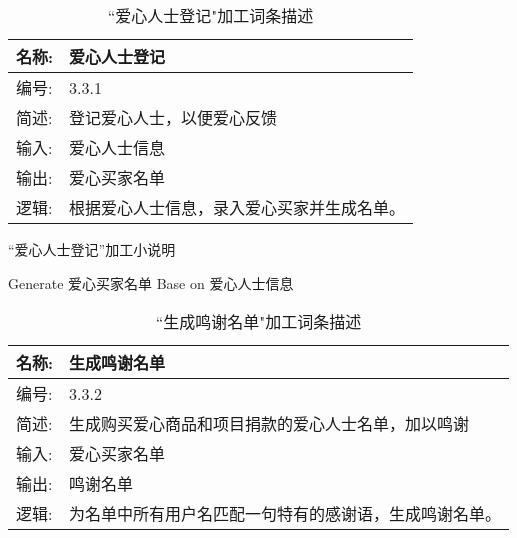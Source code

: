 \begin{table}[H]  
    \caption{``爱心人士登记"加工词条描述}  
    \begin{center}  
        \begin{tabular}{l p{11cm}} 
            \hline
            \quad 名称:  &   爱心人士登记 \\
            \hline
            \quad 编号:  & 3.3.1 \\
            \hline
            \quad 简述:  & 登记爱心人士，以便爱心反馈 \\
            \hline
            \quad 输入:  & 爱心人士信息\\
            \hline
            \quad 输出:  & 爱心买家名单 \\
            \hline
            \quad 逻辑:  & 根据爱心人士信息，录入爱心买家并生成名单。 \\
            \hline
        \end{tabular}
        \label{tab1}
    \end{center}
    \end{table}

\begin{algorithm}[H]
    \renewcommand{\thealgorithm}{}
    \caption{“爱心人士登记”加工小说明} 
    \label{alg3} 
    \begin{algorithmic}[1] 
        \STATE Generate 爱心买家名单 Base on 爱心人士信息
    \end{algorithmic} 
\end{algorithm}
    
    \begin{table}[H]  
    \caption{``生成鸣谢名单"加工词条描述}  
    \begin{center}  
        \begin{tabular}{l p{11cm}} 
            \hline
            \quad 名称:  &   生成鸣谢名单 \\
            \hline
            \quad 编号:  & 3.3.2 \\
            \hline
            \quad 简述:  & 生成购买爱心商品和项目捐款的爱心人士名单，加以鸣谢 \\
            \hline
            \quad 输入:  & 爱心买家名单 \\
            \hline
            \quad 输出:  & 鸣谢名单 \\
            \hline
            \quad 逻辑:  & 为名单中所有用户名匹配一句特有的感谢语，生成鸣谢名单。 \\
            \hline
        \end{tabular}
        \label{tab1}
    \end{center}
    \end{table}

